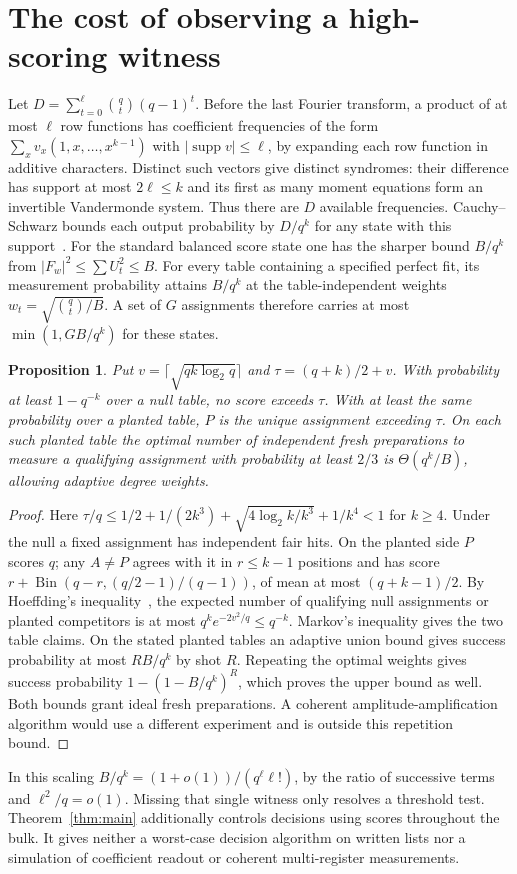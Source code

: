 \documentclass[11pt]{article}
\newtheorem{prop}[theorem]{Proposition}
\newcommand{\Bin}{\operatorname{Bin}}
\begin{document}
\section{The cost of observing a high-scoring witness}\label{sec:witness}
Let $D=\sum_{t=0}^\ell\binom qt(q-1)^t$. Before the last Fourier transform, a product of at most $\ell$ row functions has coefficient frequencies of the form $\sum_x v_x(1,x,\ldots,x^{k-1})$ with $|\operatorname{supp}v|\le\ell$, by expanding each row function in additive characters. Distinct such vectors give distinct syndromes: their difference has support at most $2\ell\le k$ and its first as many moment equations form an invertible Vandermonde system. Thus there are $D$ available frequencies. Cauchy--Schwarz bounds each output probability by $D/q^k$ for any state with this support~\cite{childs}. For the standard balanced score state one has the sharper bound $B/q^k$ from $|F_w|^2\le\sum U_t^2\le B$. For every table containing a specified perfect fit, its measurement probability attains $B/q^k$ at the table-independent weights $w_t=\sqrt{\binom qt/B}$. A set of $G$ assignments therefore carries at most $\min(1,GB/q^k)$ for these states.

\begin{prop}\label{prop:witness}
Put $v=\lceil\sqrt{qk\log_2q}\rceil$ and $\tau=(q+k)/2+v$. With probability at least $1-q^{-k}$ over a null table, no score exceeds $\tau$. With at least the same probability over a planted table, $P$ is the unique assignment exceeding $\tau$. On each such planted table the optimal number of independent fresh preparations to measure a qualifying assignment with probability at least $2/3$ is $\Theta(q^k/B)$, allowing adaptive degree weights.
\end{prop}
\begin{proof}
Here $\tau/q\le 1/2+1/(2k^3)+\sqrt{4\log_2 k/k^3}+1/k^4<1$ for $k\ge4$. Under the null a fixed assignment has independent fair hits. On the planted side $P$ scores $q$; any $A\ne P$ agrees with it in $r\le k-1$ positions and has score $r+\Bin(q-r,(q/2-1)/(q-1))$, of mean at most $(q+k-1)/2$. By Hoeffding's inequality~\cite{hoeffding}, the expected number of qualifying null assignments or planted competitors is at most $q^k e^{-2v^2/q}\le q^{-k}$. Markov's inequality gives the two table claims. On the stated planted tables an adaptive union bound gives success probability at most $RB/q^k$ by shot $R$. Repeating the optimal weights gives success probability $1-(1-B/q^k)^R$, which proves the upper bound as well. Both bounds grant ideal fresh preparations. A coherent amplitude-amplification algorithm would use a different experiment and is outside this repetition bound.
\end{proof}
In this scaling $B/q^k=(1+o(1))/(q^\ell\ell!)$, by the ratio of successive terms and $\ell^2/q=o(1)$. Missing that single witness only resolves a threshold test. Theorem~\ref{thm:main} additionally controls decisions using scores throughout the bulk. It gives neither a worst-case decision algorithm on written lists nor a simulation of coefficient readout or coherent multi-register measurements.
\end{document}
